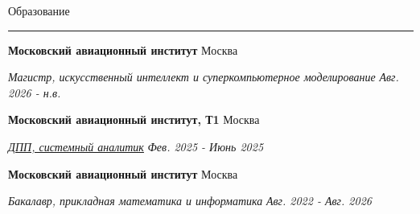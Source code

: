 \documentclass[14pt, a4paper, oneside]{extarticle}
\begin{document}

\begin{flushleft}
	\vspace{-\intextsep}
	\large Образование
\end{flushleft}

\vspace{-0.8\intextsep}
\hrule


\begin{flushleft}
	\vspace{-0.8\intextsep}
	\quad
	\textbf{Московский авиационный институт}
	\hfill
	Москва
\end{flushleft}

\begin{flushleft}
	\vspace{-\intextsep}
	\quad
	\textit{\footnotesize Магистр, %
	искусственный интеллект и суперкомпьютерное моделирование}
	\hfill
	\textit{\small Авг. 2026 - н.в.}
\end{flushleft}


\begin{flushleft}
	\vspace{-0.8\intextsep}
	\quad
	\textbf{Московский авиационный институт, Т1}
	\hfill
	Москва
\end{flushleft}

\begin{flushleft}
	\vspace{-\intextsep}
	\quad
	\href{https://github.com/Crazy5202/job_application_form/tree/main/portfolio/T1/%D0%A21_%D1%81%D0%B5%D1%80%D1%82%D0%B8%D1%84%D0%B8%D0%BA%D0%B0%D1%82.pdf}{\textit{ДПП, системный аналитик}}
	\hfill
	\textit{\small Фев. 2025 - Июнь 2025}
\end{flushleft}


\begin{flushleft}
	\vspace{-0.8\intextsep}
	\quad
	\textbf{Московский авиационный институт}
	\hfill
	Москва
\end{flushleft}

\begin{flushleft}
	\vspace{-\intextsep}
	\quad
	\textit{Бакалавр, прикладная математика и информатика}
	\hfill
	\textit{\small Авг. 2022 - Авг. 2026}
\end{flushleft}
\end{document}
